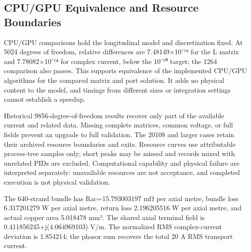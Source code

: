 \documentclass[11pt]{article}
\begin{document}
\subsection*{CPU/GPU Equivalence and Resource Boundaries}
\hypertarget{03.compute.heading}{}
CPU/GPU comparisons hold the longitudinal model and discretization fixed. At 5024 degrees of freedom, relative differences are 7.48149×10⁻¹⁶ for the L matrix and 7.78082×10⁻¹⁴ for complex current, below the 10⁻¹⁰ target; the 1264 comparison also passes. This supports equivalence of the implemented CPU/GPU algorithms for the compared matrix and port solution. It adds no physical content to the model, and timings from different sizes or integration settings cannot establish a speedup.


Historical 9856-degree-of-freedom results recover only part of the available current and related data. Missing complete matrices, common voltage, or full fields prevent an upgrade to full validation. The 20108 and larger cases retain their archived resource boundaries and exits. Resource curves use attributable process-tree samples only; short peaks may be missed and records mixed with unrelated PIDs are excluded. Computational capability and physical failure are interpreted separately: unavailable resources are not acceptance, and completed execution is not physical validation.


The 640-strand bundle has Rac=15.793003197 mΩ per axial metre, bundle loss 6.317201279 W per axial metre, return loss 2.196205516 W per axial metre, and actual copper area 5.018478 mm². The shared axial terminal field is 0.411856245+j(4.064969103) V/m. The normalized RMS complex-current deviation is 1.854214; the phasor sum recovers the total 20 A RMS transport current.
\end{document}
